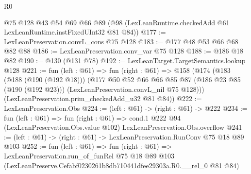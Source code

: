 \begin{lexlean}{R0}
\begin{coremodule}
    @75
    @128
    @43
    @54
    @69
    @66
    @89
    (@98 (LexLeanRuntime.checkedAdd @61 LexLeanRuntime.instFixedUInt32 @81 @84))
@177 := LexLeanPreservation.convL_cons @75 @128
@183 := @177 @48 @53 @66 @68 @82 @88
@186 := LexLeanPreservation.conv_var @75 @128
@188 := @186 @18 @82
@190 := @130 (@131 @78)
@192 := LexLeanTarget.TargetSemantics.lookup @128
@221 := fun (left : @61) =>
  fun (right : @61) =>
  @158
    (@174
      (@183
        (@188 (@190 (@192 @18)))
        (@177
          @50
          @52
          @66
          @66
          @85
          @87
          (@186 @23 @85 (@190 (@192 @23)))
          (LexLeanPreservation.convL_nil @75 @128)))
      (LexLeanPreservation.prim_checkedAdd_u32 @81 @84))
@222 := LexLeanPreservation.Obs
@224 := (left : @61) -> (right : @61) -> @222
@234 := fun (left : @61) =>
  fun (right : @61) =>
  cond.{1} @222 @94 (LexLeanPreservation.Obs.value @102) LexLeanPreservation.Obs.overflow
@241 := (left : @61) -> (right : @61) -> LexLeanPreservation.RunConv @75 @18 @89 @103
@252 := fun (left : @61) =>
  fun (right : @61) =>
  LexLeanPreservation.run_of_funRel
    @75
    @18
    @89
    @103
    (LexLeanPreserve.Cefabf0230261b8db710441dfee29303a.R0.__rel_0 @81 @84)
\end{coremodule}
\end{lexlean}
